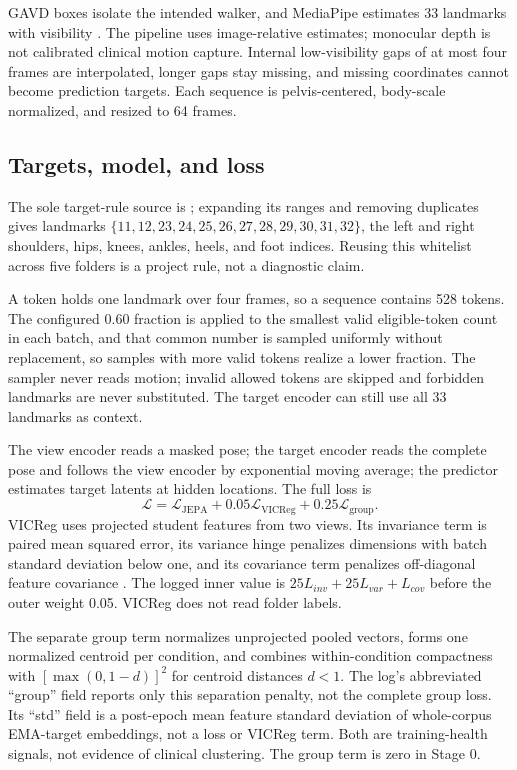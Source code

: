 \documentclass[conference]{IEEEtran}
\begin{document}
GAVD boxes isolate the intended walker, and MediaPipe estimates 33 landmarks with visibility \cite{grishchenko2022blazepose,mediapipePoseLandmarker}. The pipeline uses image-relative estimates; monocular depth is not calibrated clinical motion capture. Internal low-visibility gaps of at most four frames are interpolated, longer gaps stay missing, and missing coordinates cannot become prediction targets. Each sequence is pelvis-centered, body-scale normalized, and resized to 64 frames.

\subsection{Targets, model, and loss}
The sole target-rule source is ; expanding its ranges and removing duplicates gives landmarks $\{11,12,23,24,25,26,27,28,29,30,31,32\}$, the left and right shoulders, hips, knees, ankles, heels, and foot indices. Reusing this whitelist across five folders is a project rule, not a diagnostic claim.

A token holds one landmark over four frames, so a sequence contains 528 tokens. The configured 0.60 fraction is applied to the smallest valid eligible-token count in each batch, and that common number is sampled uniformly without replacement, so samples with more valid tokens realize a lower fraction. The sampler never reads motion; invalid allowed tokens are skipped and forbidden landmarks are never substituted. The target encoder can still use all 33 landmarks as context.

The view encoder reads a masked pose; the target encoder reads the complete pose and follows the view encoder by exponential moving average; the predictor estimates target latents at hidden locations. The full loss is
\begin{equation}
\mathcal L=\mathcal L_{\mathrm{JEPA}}+0.05\mathcal L_{\mathrm{VICReg}}+0.25\mathcal L_{\mathrm{group}}.
\end{equation}
VICReg uses projected student features from two views. Its invariance term is paired mean squared error, its variance hinge penalizes dimensions with batch standard deviation below one, and its covariance term penalizes off-diagonal feature covariance \cite{bardes2022vicreg}. The logged inner value is $25L_{inv}+25L_{var}+L_{cov}$ before the outer weight 0.05. VICReg does not read folder labels.

The separate group term normalizes unprojected pooled vectors, forms one normalized centroid per condition, and combines within-condition compactness with $[\max(0,1-d)]^2$ for centroid distances $d<1$. The log's abbreviated ``group'' field reports only this separation penalty, not the complete group loss. Its ``std'' field is a post-epoch mean feature standard deviation of whole-corpus EMA-target embeddings, not a loss or VICReg term. Both are training-health signals, not evidence of clinical clustering. The group term is zero in Stage 0.
\end{document}
